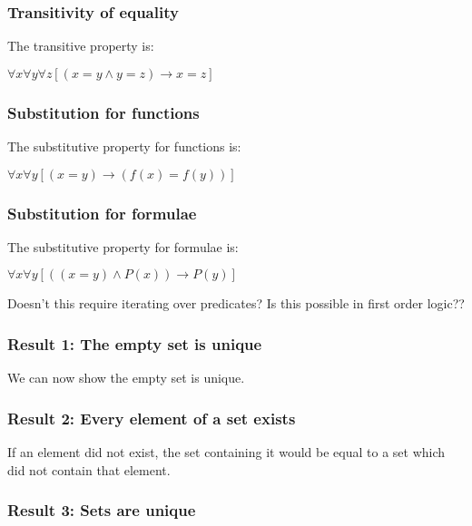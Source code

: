 \subsubsection{Transitivity of equality}

The transitive property is:

$\forall x \forall y \forall z[(x=y \land y=z) \rightarrow x=z]$

\subsubsection{Substitution for functions}

The substitutive property for functions is:

$\forall x \forall y[(x=y)\rightarrow (f(x)=f(y))]$

\subsubsection{Substitution for formulae}

The substitutive property for formulae is:

$\forall x \forall y[((x=y)\land P(x))\rightarrow P(y)]$

Doesn’t this require iterating over predicates? Is this possible in first order logic??

\subsubsection{Result 1: The empty set is unique}

We can now show the empty set is unique.

\subsubsection{Result 2: Every element of a set exists}

If an element did not exist, the set containing it would be equal to a set which did not contain that element.

\subsubsection{Result 3: Sets are unique}


